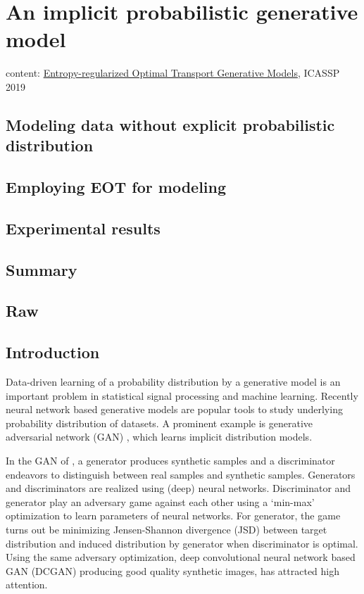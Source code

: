 \chapter{An implicit probabilistic generative model}
\label{chapter8}
\graphicspath{{source/chapter8/}}


content: \href{https://ieeexplore.ieee.org/stamp/stamp.jsp?arnumber=8682721}{Entropy-regularized Optimal Transport Generative Models}, ICASSP 2019


\section{Modeling data without explicit probabilistic distribution}

\section{Employing EOT for modeling}

\section{Experimental results}

\section{Summary}
\section{Raw}
\section{Introduction}

Data-driven learning of a probability distribution by a generative model is an important problem 
in statistical signal processing and machine learning. 
Recently neural network based generative models are popular tools to
study underlying probability distribution of datasets. A prominent example is 
generative adversarial network (GAN) \cite{NIPS2014_5423}, which learns 
implicit distribution models. 

In the GAN of \cite{NIPS2014_5423}, a generator produces
synthetic samples and a discriminator endeavors to
distinguish between real samples and synthetic samples. Generators and discriminators are realized using (deep) neural networks.
Discriminator and generator
play an adversary game against each other using a `min-max' optimization to learn parameters of neural networks. 
For generator, the game
turns out be minimizing Jensen-Shannon divergence (JSD) between
target distribution and induced distribution by generator when discriminator is
optimal. Using the same adversary
optimization, deep convolutional neural network based GAN (DCGAN)
\cite{2015arXiv151106434R} producing good quality synthetic images, has attracted high attention.

